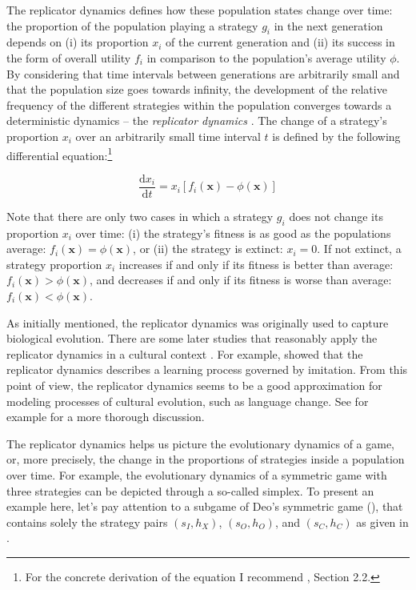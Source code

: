 \documentclass[output=paper,hidelinks]{langscibook}
\begin{document}
The replicator dynamics defines how these population states change over time: the proportion of the population playing a strategy $g_i$ in the next generation depends on (i) its proportion $x_i$ of the current generation and (ii) its success in the form of overall utility $f_i$ in comparison to the population's average utility $\phi$. By considering that time intervals between generations are arbitrarily small and that the population size goes towards infinity, the development of the relative frequency of the different strategies within the population converges towards a deterministic dynamics -- the \emph{replicator dynamics} \citep{Taylor78}. The change of a strategy's proportion $x_i$ over an arbitrarily small time interval $t$ is defined by the following differential equation:\footnote{For the concrete derivation of the equation I recommend \citet{Jaeger04}, Section 2.2.}

$$\frac{\text{d}x_i}{\text{d}t} = x_i[f_i(\textbf{x})-\phi(\textbf{x})]$$


Note that there are only two cases in which a strategy $g_i$ does not change its proportion $x_i$ over time: (i) the strategy's fitness is as good as the populations average: $f_i(\textbf{x})=\phi(\textbf{x})$, or (ii) the strategy is extinct: $x_i = 0$. If not extinct, a strategy proportion $x_i$ increases if and only if its fitness is better than average: $f_i(\textbf{x})>\phi(\textbf{x})$, and decreases 
if and only if its fitness is worse than average: $f_i(\textbf{x})<\phi(\textbf{x})$.



As initially mentioned, the replicator dynamics was originally used to capture biological evolution. There are some later studies that reasonably apply the replicator dynamics in a cultural context \citep[cf.][]{Bjoernstedt96, Harms04}. For example, \citet{Bjoernstedt96} showed that the replicator dynamics describes a learning process governed by imitation. From this point of view, the replicator dynamics seems to be a good approximation for modeling processes of cultural evolution, such as language change. See for example \citet[92]{Jaeger07} for a more thorough discussion.

The replicator dynamics helps us picture the evolutionary dynamics of a game, or, more precisely, the change in the proportions of strategies inside a population over time. For example, the evolutionary dynamics of a symmetric game with three strategies can be depicted through a so-called simplex.
To present an example here, let's pay attention to a  subgame of Deo's symmetric game (), that contains solely the strategy pairs $(s_I, h_X)$, $(s_O, h_O)$, and $(s_C, h_C)$ as given in . 
\end{document}
